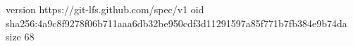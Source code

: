 version https://git-lfs.github.com/spec/v1
oid sha256:4a9c8f9278f06b711aaa6db32be950cdf3d11291597a85f771b7fb384e9b74da
size 68

